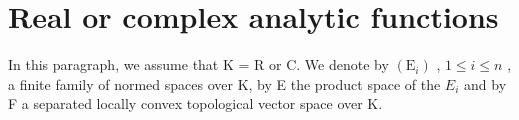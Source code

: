\section{Real or complex analytic functions}

In this paragraph, we assume that K = R or C. We denote by \((\mathrm{E}_{i})\) , \(1 \leqslant i \leqslant n\) , a finite family of normed spaces over K, by E the product space of the \(E_{i}\) and by F a separated locally convex topological vector space over K.

